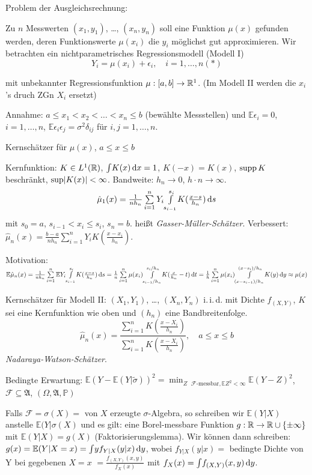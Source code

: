 \documentclass{cheat-sheet}
\newcommand{\Alg}{\mathfrak{A}} %
\renewcommand{\P}{\mathbb{P}} %
\newcommand{\E}{\mathbb{E}} %
\newcommand{\iid}{i.\,i.\,d.} %
\begin{document}


Problem der Ausgleichsrechnung:

Zu $n$ Messwerten $(x_1, y_1)$, \ldots, $(x_n, y_n)$ soll eine Funktion $\mu(x)$ gefunden werden, deren Funktionswerte $\mu(x_i)$ die $y_i$ möglichst gut approximieren.
Wir betrachten ein nichtparametrisches Regressionsmodell (Modell I)
\[
  Y_i = \mu(x_i) + \epsilon_i, \quad
  i = 1, \ldots, n (*)
\]

mit unbekannter Regressionsfunktion $\mu : \left[ a, b \right] \to \mathbb{R}^1$.
(Im Modell II werden die $x_i$'s druch ZGn $X_i$ ersetzt)

Annahme: $a \leq x_1 < x_2 < \ldots < x_n \leq b$ (bewählte Messstellen) und $\E \epsilon_i = 0$, $i = 1, \ldots, n$, $\E \epsilon_i \epsilon_j = \sigma^2 \delta_{ij}$ für $i, j = 1, \ldots, n$.

Kernschätzer für $\mu(x)$, $a \leq x \leq b$

Kernfunktion: $K \in L^1(\mathbb{R})$, ${\textstyle \int} K(x) \,\mathrm{d} x = 1$, $K(-x) = K(x)$, $\operatorname{supp} K$ beschränkt, $\sup \lvert K(x)\rvert < \infty$.
Bandweite: $h_n \to 0$, $h \cdot n \to \infty$.
\[
  \hat{\mu}_1(x) = \tfrac{1}{n h_n} \sum_{i=1}^n Y_i \Int{s_{i-1}}{s_i}{K(\tfrac{x-s}{h_n})}{s}
\]
mit $s_0 = a$, $s_{i-1} < x_i \leq s_i$, $s_n = b$. %
heißt \emph{Gasser-Müller-Schätzer}.
Verbessert: $\hat{\mu}_n(x) = \tfrac{b-a}{n h_n} \sum_{i=1}^n Y_i K(\tfrac{x-x_i}{h_n})$.

Motivation: $\E \hat{\mu}_n(x) = \tfrac{1}{n h_n} \sum_{i=1}^n \E Y_i \Int{s_{i-1}}{s_i}{K(\tfrac{x-s}{h_n})}{s} = \tfrac{1}{n} \sum_{i=1}^n \mu(x_i) \Int{s_{i-1}/h_n}{s_i/h_n}{K(\tfrac{x}{h_n} - t)}{t} = \tfrac{1}{h} \sum_{i=1}^n \mu(x_i) \Int{(x-s_{i-1})/h_n}{(x-s_i)/h_n}{K(y)}{y} \approx \mu(x)$

Kernschätzer für Modell II:
$(X_1, Y_1)$, \ldots, $(X_n, Y_n)$ \iid{} mit Dichte $f_{(X,Y)}$, $K$ sei eine Kernfunktion wie oben und $(h_n)$ eine Bandbreitenfolge.
\[
  \hat{\mu}_n (x) = \frac{\sum_{i=1}^n K(\tfrac{x - X_i}{h_n})}{\sum_{i=1}^n K(\tfrac{x - X_i}{h_n})}, \quad
  a \leq x \leq b
\]
\emph{Nadaraya-Watson-Schätzer}.

Bedingte Erwartung: $\E (Y - \E(Y | \tilde{\sigma}))^2 = \min_{Z \text{ $\mathcal{F}$-messbar}, \E Z^2 < \infty} \E (Y-Z)^2$, $\mathcal{F} \subseteq \Alg$, $(\Omega, \Alg, \P)$

Falls $\mathcal{F} = \sigma(X) = $ von $X$ erzeugte $\sigma$-Algebra, so schreiben wir $\E(Y|X)$ anstelle $\E(Y|\sigma(X)$ und es gilt: eine Borel-messbare Funktion $g : \mathbb{R} \to \mathbb{R} \cup \{ \pm \infty \}$ mit $\E(Y|X) = g(X)$ (Faktorisierungslemma).
Wir können dann schreiben: $g(x) = \E(Y|X=x) = \IInt{y f_{Y|X}(y|x)}{y}$, wobei $f_{Y|X}(y|x) =$ bedingte Dichte von Y bei gegebenen $X=x$ $= \frac{f_{(X, Y)}(x, y)}{f_X(x)}$ mit $f_X(x) = {\textstyle \int} f_{(X, Y)}(x,y) \,\mathrm{d} y$.
\end{document}
